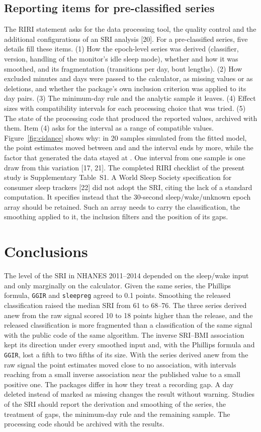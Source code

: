 \documentclass[12pt]{article}
\begin{document}
\subsection{Reporting items for pre-classified series}
The RIRI statement asks for the data processing tool, the quality control and the additional configurations of an SRI analysis [20]. For a pre-classified series, five details fill these items. (1) How the epoch-level series was derived (classifier,
version, handling of the monitor's idle sleep mode), whether and how it was
smoothed, and its fragmentation (transitions per day, bout lengths). (2) How
excluded minutes and days were passed to the calculator, as missing values or
as deletions, and whether the package's own inclusion criterion was applied to
its day pairs. (3) The minimum-day rule and the analytic sample it leaves. (4)
Effect sizes with compatibility intervals for each processing choice that was
tried. (5) The state of the processing code that produced the reported values,
archived with them. Item (4) asks for the interval as a range of compatible
values. Figure~\ref{fig:cidance} shows why: in 20 samples simulated from the
fitted model, the point estimates moved between \simTwoMfMin{} and
\simTwoMfMax{} and the interval ends by more, while the factor that generated
the data stayed at \simTwoTruth{}. One interval from one sample is one draw
from this variation [17, 21]. The completed RIRI checklist of the present study is Supplementary Table~S1. A
World Sleep Society specification for consumer sleep trackers [22] did not adopt the SRI, citing the lack of a standard computation. It specifies instead that the 30-second sleep/wake/unknown epoch array should be retained. Such an array needs to carry the classification, the smoothing
applied to it, the inclusion filters and the position of its gaps.

\section{Conclusions}
The level of the SRI in NHANES 2011--2014 depended on the sleep/wake input and
only marginally on the calculator. Given the same series, the Phillips formula,
\texttt{GGIR} and \texttt{sleepreg} agreed to 0.1 points. Smoothing the released
classification raised the median SRI from 61 to 68--76. The three series derived
anew from the raw signal scored 10 to 18 points higher than the release, and the
released classification is more fragmented than a classification of the same
signal with the public code of the same algorithm. The inverse SRI--BMI association kept its direction under every smoothed input and, with the Phillips formula and \texttt{GGIR}, lost a fifth to two fifths of its size. With the series derived anew from the raw signal the point estimates moved close to no association, with intervals reaching from a small inverse association near the published value to a small positive one. The packages differ in how they treat a
recording gap. A day deleted instead of marked as missing changes the result
without warning. Studies of the SRI should report the derivation and smoothing
of the series, the treatment of gaps, the minimum-day rule and the remaining
sample. The processing code should be archived with the results.
\end{document}
